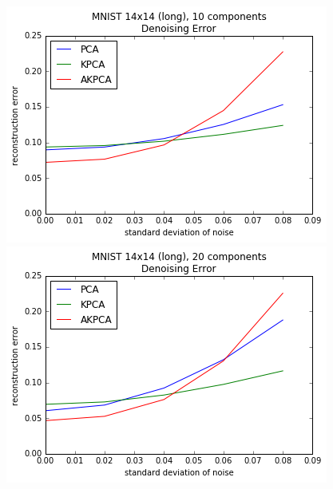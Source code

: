 \documentclass[]{article}
\begin{document}
\begin{figure}[h]
\begin{center}
\includegraphics[scale=0.5]{figures/mnist_14_long_denoise_k10}
\includegraphics[scale=0.5]{figures/mnist_14_long_denoise_k20}


\end{center}
\end{figure}
\end{document}
